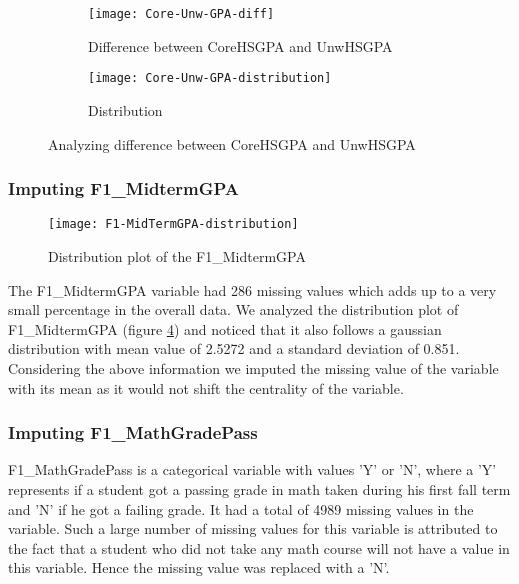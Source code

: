 \documentclass[11pt,openright]{report}
\begin{document}
\begin{figure}[!htbp]
\centering
    \begin{subfigure}[b]{0.55\textwidth}            
            \texttt{[image: Core-Unw-GPA-diff]}
            \caption{Difference between CoreHSGPA and UnwHSGPA}
            \label{fig:Core_Unw_diff}
    \end{subfigure}%
    \begin{subfigure}[b]{0.55\textwidth}
            \centering
            \texttt{[image: Core-Unw-GPA-distribution]}
            \caption{Distribution }
            \label{fig:Core_Unw_dist}
    \end{subfigure}
    \caption{Analyzing difference between CoreHSGPA and UnwHSGPA }\label{fig:diffHSGPA}
\end{figure}

\subsubsection {Imputing F1\_MidtermGPA}

\begin{figure}[!ht]
	\centering
	\texttt{[image: F1-MidTermGPA-distribution]}
	\caption{Distribution plot of the F1\_MidtermGPA}
	\label{fig:F1_MidtermGPA_plot}
\end{figure}

The F1\_MidtermGPA variable had 286 missing values which adds up to a very small percentage in the overall data. We analyzed the distribution plot of F1\_MidtermGPA (figure \ref{fig:F1_MidtermGPA_plot}) and noticed that it also follows a gaussian distribution with mean value of 2.5272 and a standard deviation of 0.851. Considering the above information we imputed the missing value of the variable with its mean as it would not shift the centrality of the variable.

\subsubsection {Imputing F1\_MathGradePass}
F1\_MathGradePass is a categorical variable with values 'Y' or 'N', where a 'Y' represents if a student got a passing grade in math taken during his first fall term and 'N' if he got a failing grade. It had a total of 4989 missing values in the variable. Such a large number of missing values for this variable is attributed to the fact that a student who did not take any math course will not have a value in this variable. Hence the missing value was replaced with a 'N'.
\end{document}

